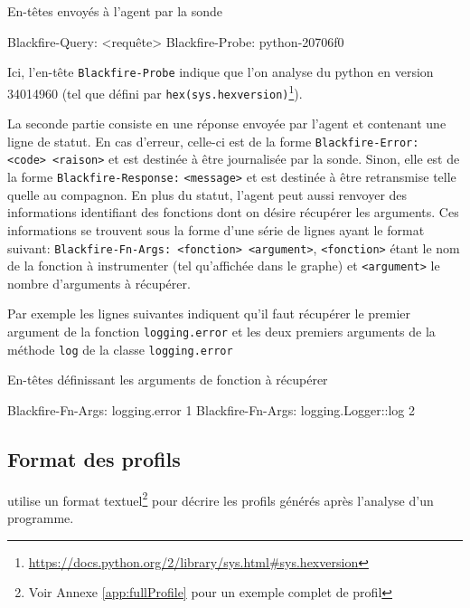 \begin{listing}[H]
\caption{En-têtes envoyés à l'agent par la sonde}
\begin{textcode}
Blackfire-Query: <requête>
Blackfire-Probe: python-20706f0
\end{textcode}
\end{listing}
Ici, l'en-tête \verb|Blackfire-Probe| indique que l'on analyse du python en version 34014960 (tel que défini par \texttt{hex(sys.hexversion)}\footnote{\url{https://docs.python.org/2/library/sys.html#sys.hexversion}}).

La seconde partie consiste en une réponse envoyée par l'agent et contenant une ligne de statut. En cas d'erreur, celle-ci est de la forme \verb|Blackfire-Error: <code> <raison>| et est destinée à être journalisée par la sonde. Sinon, elle est de la forme \verb|Blackfire-Response:| \verb|<message>| et est destinée à être retransmise telle quelle au compagnon. En plus du statut, l'agent peut aussi renvoyer des informations identifiant des fonctions dont on désire récupérer les arguments. Ces informations se trouvent sous la forme d'une série de lignes ayant le format suivant: \verb|Blackfire-Fn-Args: <fonction> <argument>|,
\verb|<fonction>| étant le nom de la fonction à instrumenter (tel qu'affichée dans le graphe) et \verb|<argument>| le nombre d'arguments à récupérer.

Par exemple les lignes suivantes indiquent qu'il faut récupérer le premier argument de la fonction \verb|logging.error| et les deux premiers arguments de la méthode \verb|log| de la classe \verb|logging.error|
\begin{listing}[H]
\caption{En-têtes définissant les arguments de fonction à récupérer}
\begin{textcode}
Blackfire-Fn-Args: logging.error 1
Blackfire-Fn-Args: logging.Logger::log 2
\end{textcode}
\end{listing}

				\subsection{Format des profils}
\Blackfire utilise un format textuel\footnote{Voir Annexe \vref{app:fullProfile} pour un exemple complet de profil} pour décrire les profils générés après l'analyse d'un programme.

